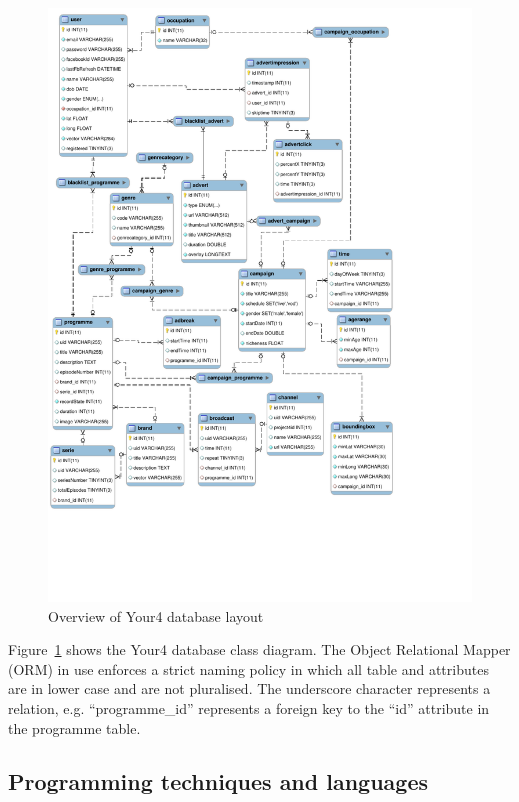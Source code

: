 \begin{figure}[H]
	\centering
	\includegraphics[trim = 0 3.7cm 3.5cm 0, clip, width=\textwidth]{images/your4-db.pdf}
	\caption{Overview of Your4 database layout}
	\label{fig:your4-db}
\end{figure}

Figure~\ref{fig:your4-db} shows the Your4 database class diagram. The Object Relational Mapper (ORM) in use enforces a strict naming policy in which all table and attributes are in lower case and are not pluralised. The underscore character represents a relation, e.g. ``programme\_id'' represents a foreign key to the ``id'' attribute in the programme table.

\subsection{Programming techniques and languages}

